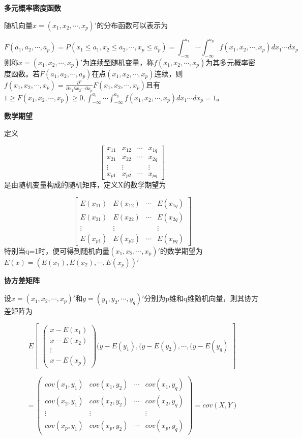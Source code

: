 \documentclass[]{ctexbook}
\begin{document}
\textbf{多元概率密度函数}

随机向量\(x=(x_1,x_2,\cdots,x_p)'\)的分布函数可以表示为

\[F(a_1,a_2,\cdots,a_p)=P(x_1\le a_1,x_2\le a_2,\cdots,x_p\le a_p)=\int_{-\infty}^{a_1}\cdots\int_{-\infty}^{a_p}f(x_1,x_2,\cdots,x_p)dx_1\cdots dx_p\]
则称\(x=(x_1,x_2,\cdots,x_p)'\)为连续型随机变量，称\(f(x_1,x_2,\cdots,x_p)\)为其多元概率密度函数。若\(F(a_1,a_2,\cdots,a_p)\)在点\((x_1,x_2,\cdots,x_p)\)连续，则\(f(x_1,x_2,\cdots,x_p)=\frac{\partial^p}{\partial x_1\partial x_2\cdots\partial x_p}F(x_1,x_2,\cdots,x_p)\)且有\(1\ge F(x_1,x_2,\cdots,x_p)\ge 0,\int_{-\infty}^{a_1}\cdots\int_{-\infty}^{a_p}f(x_1,x_2,\cdots,x_p)dx_1\cdots dx_p=1\)。

\textbf{数学期望}

定义

\[\begin{bmatrix} x_{11} & x_{12} & \cdots & x_{1q} \\ x_{21} & x_{22} & \cdots & x_{2q} \\ \vdots & \vdots &  & \vdots \\ x_{p1} & x_{p2} & \cdots & x_{pq} \end{bmatrix}\]
是由随机变量构成的随机矩阵，定义X的数学期望为

\[\begin{bmatrix} E(x_{11}) & E(x_{12}) & \cdots & E(x_{1q}) \\ E(x_{21}) & E(x_{22}) & \cdots & E(x_{2q}) \\ \vdots & \vdots &  & \vdots \\ E(x_{p1}) & E(x_{p2}) & \cdots & E(x_{pq}) \end{bmatrix}\]
特别当q=1时，便可得到随机向量\((x_1,x_2,\cdots,x_p)'\)的数学期望为\(E(x)=(E(x_1),E(x_2),\cdots,E(x_p))'\)

\textbf{协方差矩阵}

设\(x=(x_1,x_2,\cdots,x_p)'\)和\(y=(y_1,y_2,\cdots,y_q)'\)分别为p维和q维随机向量，则其协方差矩阵为

\[E\begin {bmatrix} \begin {pmatrix} x-E(x_1) \\ x-E(x_2) \\ \vdots \\ x-E(x_p) \end{pmatrix} (y-E(y_1),(y-E(y_2),\cdots,(y-E(y_q) \end {bmatrix}\]

\[=\begin {pmatrix} cov(x_1,y_1) & cov(x_1,y_2) & \cdots & cov(x_1,y_q) \\ cov(x_2,y_1) & cov(x_2,y_2) & \cdots & cov(x_2,y_q) \\ \vdots & \vdots &  & \vdots \\ cov(x_p,y_1) & cov(x_p,y_2) & \cdots & cov(x_p,y_q) \end {pmatrix}=cov(X,Y)\]
\end{document}
